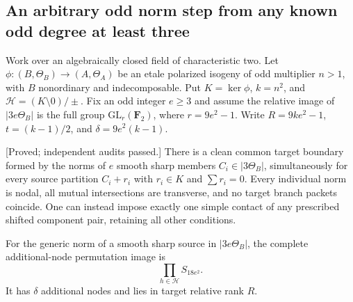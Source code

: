 \subsection{An arbitrary odd norm step from any known odd degree at least three}
\label{subsec:cubic-component-norm-transfer-candidate}

Work over an algebraically closed field of characteristic two. Let
$\phi:(B,\Theta_B)\to(A,\Theta_A)$ be an etale polarized isogeny
of odd multiplier $n>1$, with $B$ nonordinary and indecomposable.
Put $K=\ker\phi$, $k=n^2$, and $\mathcal H=(K\setminus0)/\pm$.
Fix an odd integer $e\ge3$ and assume the relative image of
$|3e\Theta_B|$ is the full group $\mathrm{GL}_r(\mathbf F_2)$,
where $r=9e^2-1$. Write $R=9ke^2-1$, $t=(k-1)/2$, and
$\delta=9e^2(k-1)$.

\begin{lemma}
\label{lem:cubic-component-clean-node-product-candidate}
\textup{[Proved; independent audits passed.]}
There is a clean common target boundary formed by the norms of
$e$ smooth sharp members $C_i\in|3\Theta_B|$, simultaneously for
every source partition $C_i+r_i$ with $r_i\in K$ and $\sum r_i=0$.
Every individual norm is nodal, all mutual intersections are
transverse, and no target branch packets coincide. One can instead
impose exactly one simple contact of any prescribed shifted
component pair, retaining all other conditions.

For the generic norm of a smooth sharp source in $|3e\Theta_B|$,
the complete additional-node permutation image is
\[
                         \prod_{h\in\mathcal H}S_{18e^2}.
\]
It has $\delta$ additional nodes and lies in target relative rank $R$.
\end{lemma}

